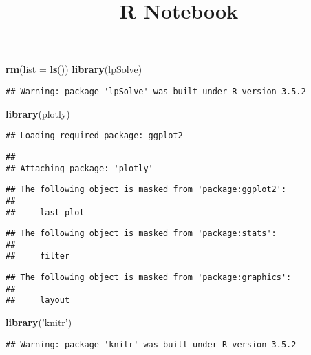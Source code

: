 \documentclass[
]{article}
\title{R Notebook}
\author{}
\date{\vspace{-2.5em}}
\newenvironment{Shaded}{\begin{snugshade}}{\end{snugshade}}
\newcommand{\DataTypeTok}[1]{\textcolor[rgb]{0.13,0.29,0.53}{#1}}
\newcommand{\KeywordTok}[1]{\textcolor[rgb]{0.13,0.29,0.53}{\textbf{#1}}}
\newcommand{\NormalTok}[1]{#1}
\newcommand{\StringTok}[1]{\textcolor[rgb]{0.31,0.60,0.02}{#1}}
\begin{document}
\maketitle

\begin{Shaded}
\begin{Highlighting}[]
\KeywordTok{rm}\NormalTok{(}\DataTypeTok{list =} \KeywordTok{ls}\NormalTok{())}
\KeywordTok{library}\NormalTok{(lpSolve)}
\end{Highlighting}
\end{Shaded}

\begin{verbatim}
## Warning: package 'lpSolve' was built under R version 3.5.2
\end{verbatim}

\begin{Shaded}
\begin{Highlighting}[]
\KeywordTok{library}\NormalTok{(plotly)}
\end{Highlighting}
\end{Shaded}

\begin{verbatim}
## Loading required package: ggplot2
\end{verbatim}

\begin{verbatim}
## 
## Attaching package: 'plotly'
\end{verbatim}

\begin{verbatim}
## The following object is masked from 'package:ggplot2':
## 
##     last_plot
\end{verbatim}

\begin{verbatim}
## The following object is masked from 'package:stats':
## 
##     filter
\end{verbatim}

\begin{verbatim}
## The following object is masked from 'package:graphics':
## 
##     layout
\end{verbatim}

\begin{Shaded}
\begin{Highlighting}[]
\KeywordTok{library}\NormalTok{(}\StringTok{'knitr'}\NormalTok{)}
\end{Highlighting}
\end{Shaded}

\begin{verbatim}
## Warning: package 'knitr' was built under R version 3.5.2
\end{verbatim}
\end{document}
